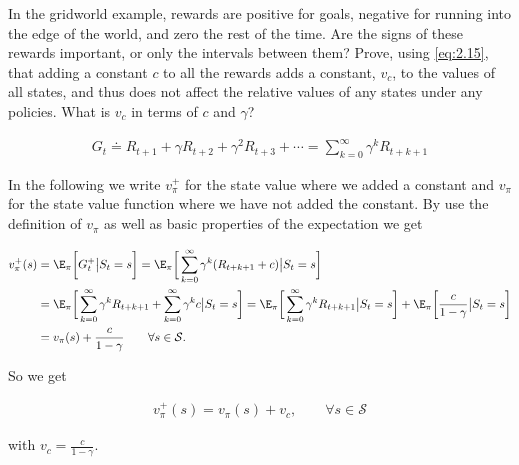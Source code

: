 \begin{exercise}
In the gridworld example, rewards are positive for goals, negative for running into the edge of the world, and zero the rest of the time.
Are the signs of these rewards important, or only the intervals between them?
Prove, using \eqref{eq:2.15}, that adding a constant $c$ to all the rewards adds a constant, $v_c$, to the values of all states, and thus does not affect the relative values of any states under any policies.
What is $v_c$ in terms of $c$ and $\gamma$?

\begin{align} \label{eq:2.15}
    G_t
    \doteq
    R_{t+1} + \gamma R_{t+2} + \gamma^2 R_{t+3} + \cdots
    =
    \sum_{k=0}^\infty
        \gamma^k R_{t+k+1}
\end{align}

\end{exercise}

\begin{solution}
In the following we write $ v_\pi^+$ for the state value where we added a constant and $v_\pi$ for the state value function where we have not added the constant. By use the definition of $v_\pi$ as well as basic properties of the expectation we get

\begin{align*}
  v_\pi^+(s)
  &=
  \E_\pi
  \bigg[
  G_t^+ \big| S_t = s
  \bigg]
  =
  \E_\pi
  \bigg[
  \sum_{k=0}^\infty \gamma^k (R_{t+k+1} + c) \big| S_t = s
  \bigg] \\
  &=
  \E_\pi
  \bigg[
  \sum_{k=0}^\infty \gamma^k R_{t+k+1} + \sum_{k=0}^\infty \gamma^k c \big| S_t = s
  \bigg]
  =
  \E_\pi
  \bigg[
  \sum_{k=0}^\infty \gamma^k R_{t+k+1} \big| S_t = s
  \bigg]
  +
  \E_\pi
  \bigg[
  \frac{c}{1-\gamma} \big| S_t = s
  \bigg] \\
  &=
  v_\pi(s) + \frac{c}{1-\gamma} \qquad \forall s \in \mathcal{S}.
\end{align*}

So we get

\begin{align*}
  v_\pi^+(s) = v_\pi(s) + v_c, \qquad \forall s \in \mathcal{S}
\end{align*}

with $v_c = \frac{c}{1-\gamma}$.
\end{solution}
